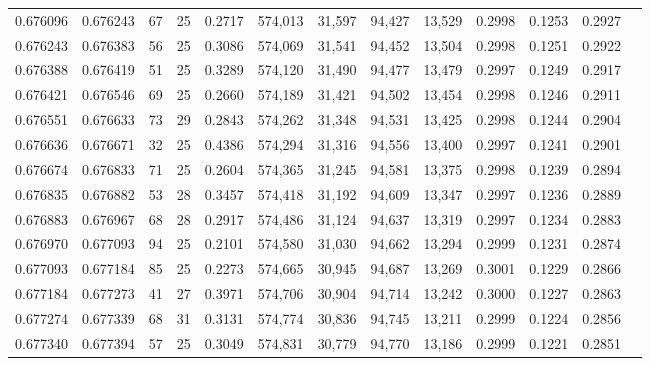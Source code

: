 \begin{tabular}{rrrrrrrrrrrrr}
0.676096 & 0.676243 &  67 &  25 &                                     0.2717 & 574,013 &  31,597 &  94,427 &  13,529 & 0.2998 & 0.1253 & 0.2927 \\
0.676243 & 0.676383 &  56 &  25 &                                     0.3086 & 574,069 &  31,541 &  94,452 &  13,504 & 0.2998 & 0.1251 & 0.2922 \\
0.676388 & 0.676419 &  51 &  25 &                                     0.3289 & 574,120 &  31,490 &  94,477 &  13,479 & 0.2997 & 0.1249 & 0.2917 \\
0.676421 & 0.676546 &  69 &  25 &                                     0.2660 & 574,189 &  31,421 &  94,502 &  13,454 & 0.2998 & 0.1246 & 0.2911 \\
0.676551 & 0.676633 &  73 &  29 &                                     0.2843 & 574,262 &  31,348 &  94,531 &  13,425 & 0.2998 & 0.1244 & 0.2904 \\
0.676636 & 0.676671 &  32 &  25 &                                     0.4386 & 574,294 &  31,316 &  94,556 &  13,400 & 0.2997 & 0.1241 & 0.2901 \\
0.676674 & 0.676833 &  71 &  25 &                                     0.2604 & 574,365 &  31,245 &  94,581 &  13,375 & 0.2998 & 0.1239 & 0.2894 \\
0.676835 & 0.676882 &  53 &  28 &                                     0.3457 & 574,418 &  31,192 &  94,609 &  13,347 & 0.2997 & 0.1236 & 0.2889 \\
0.676883 & 0.676967 &  68 &  28 &                                     0.2917 & 574,486 &  31,124 &  94,637 &  13,319 & 0.2997 & 0.1234 & 0.2883 \\
0.676970 & 0.677093 &  94 &  25 &                                     0.2101 & 574,580 &  31,030 &  94,662 &  13,294 & 0.2999 & 0.1231 & 0.2874 \\
0.677093 & 0.677184 &  85 &  25 &                                     0.2273 & 574,665 &  30,945 &  94,687 &  13,269 & 0.3001 & 0.1229 & 0.2866 \\
0.677184 & 0.677273 &  41 &  27 &                                     0.3971 & 574,706 &  30,904 &  94,714 &  13,242 & 0.3000 & 0.1227 & 0.2863 \\
0.677274 & 0.677339 &  68 &  31 &                                     0.3131 & 574,774 &  30,836 &  94,745 &  13,211 & 0.2999 & 0.1224 & 0.2856 \\
0.677340 & 0.677394 &  57 &  25 &                                     0.3049 & 574,831 &  30,779 &  94,770 &  13,186 & 0.2999 & 0.1221 & 0.2851 \\

\end{tabular}
